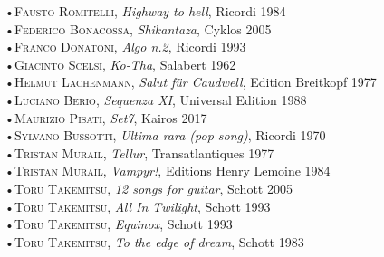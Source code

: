 \documentclass[oneside]{article}
\begin{document}
\begin{multicols*}{2}
•\textsc{\textsf {Fausto Romitelli}}, \emph{Highway to hell}, Ricordi 1984\\\newline
•\textsc{\textsf {Federico Bonacossa}}, \emph{Shikantaza}, Cyklos 2005\\\newline
•\textsc{\textsf {Franco Donatoni}}, \emph{Algo n.2}, Ricordi 1993\\\newline
•\textsc{\textsf {Giacinto Scelsi}}, \emph{Ko-Tha}, Salabert 1962\\\newline
•\textsc{\textsf {Helmut Lachenmann}}, \emph{Salut für Caudwell}, Edition Breitkopf 1977\\\newline
•\textsc{\textsf {Luciano Berio}}, \emph{Sequenza XI}, Universal Edition 1988\\\newline
•\textsc{\textsf {Maurizio Pisati}}, \emph{Set7}, Kairos 2017\\\newline
•\textsc{\textsf {Sylvano Bussotti}}, \emph{Ultima rara (pop song)}, Ricordi 1970\\\newline
•\textsc{\textsf {Tristan Murail}}, \emph{Tellur}, Transatlantiques 1977\\\newline
•\textsc{\textsf {Tristan Murail}}, \emph{Vampyr!}, Editions Henry Lemoine 1984\\\newline
•\textsc{\textsf {Toru Takemitsu}}, \emph{12 songs for guitar}, Schott 2005\\\newline
•\textsc{\textsf {Toru Takemitsu}}, \emph{All In Twilight}, Schott 1993\\\newline
•\textsc{\textsf {Toru Takemitsu}}, \emph{Equinox}, Schott 1993\\\newline
•\textsc{\textsf {Toru Takemitsu}}, \emph{To the edge of dream}, Schott 1983\\\newline


\vfill\null
\columnbreak


\end{multicols*}
\end{document}
